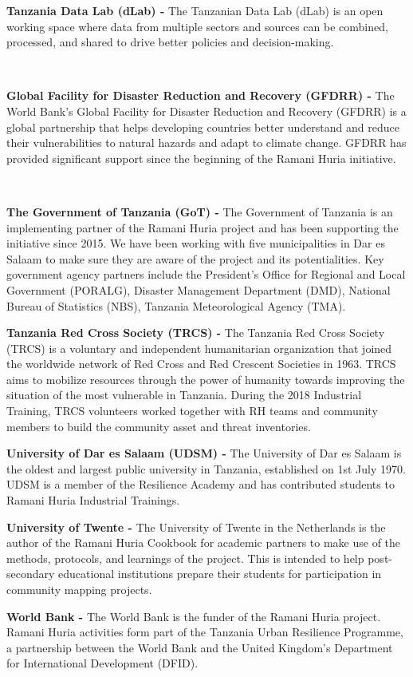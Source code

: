 \documentclass[a4paper,12pt,twoside]{article}
\begin{document}
\begin{multicols}
\textbf{Tanzania Data Lab (dLab) -} The Tanzanian Data Lab (dLab) is an open working space where data from multiple sectors and sources can be combined, processed, and shared to drive better policies and decision-making. 

\

\textbf{Global Facility for Disaster Reduction and Recovery (GFDRR) -} The World Bank’s Global Facility for Disaster Reduction and Recovery (GFDRR) is a global partnership that helps developing countries better understand and reduce their vulnerabilities to natural hazards and adapt to climate change. GFDRR has provided significant support since the beginning of the Ramani Huria initiative.

\

\textbf{The Government of Tanzania (GoT) -} The Government of Tanzania is an implementing partner of the Ramani Huria project and has been supporting the initiative since 2015. We have been working with five municipalities in Dar es Salaam to make sure they are aware of the project and its potentialities. Key government agency partners include the President’s Office for Regional and Local Government (PORALG), Disaster Management Department (DMD), National Bureau of Statistics (NBS), Tanzania Meteorological Agency (TMA).


\textbf{Tanzania Red Cross Society (TRCS) -} The Tanzania Red Cross Society (TRCS) is a voluntary and independent humanitarian organization that joined the worldwide network of Red Cross and Red Crescent Societies in 1963. TRCS aims to mobilize resources through the power of humanity towards improving the situation of the most vulnerable in Tanzania. During the 2018 Industrial Training, TRCS volunteers worked together with RH teams and community members to build the community asset and threat inventories.

\textbf{University of Dar es Salaam (UDSM) -} The University of Dar es Salaam is the oldest and largest public university in Tanzania, established on 1st July 1970. UDSM is a member of the Resilience Academy and has contributed students to Ramani Huria Industrial Trainings. 

\textbf{University of Twente -} The University of Twente in the Netherlands is the author of the Ramani Huria Cookbook for academic partners to make use of the methods, protocols, and learnings of the project. This is intended to help post-secondary educational institutions prepare their students for participation in community mapping projects. 

\textbf{World Bank -} The World Bank is the funder of the Ramani Huria project. Ramani Huria activities form part of the Tanzania Urban Resilience Programme, a partnership between the World Bank and the United Kingdom’s Department for International Development (DFID).
\end{multicols}
\end{document}
